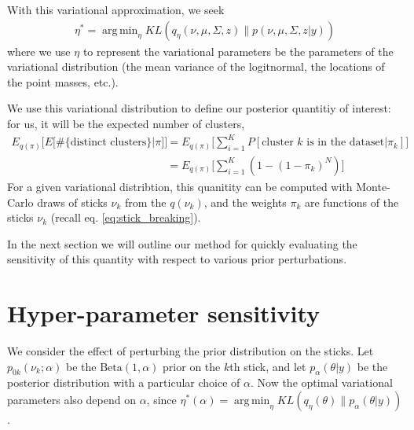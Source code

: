 \documentclass{article}
\DeclareMathOperator*{\argmin}{arg\,min}
\begin{document}
With this variational approximation, we seek
%
\begin{align}
\eta^* = \argmin_{\eta} KL\left(
    q_\eta(\nu, \mu, \Sigma, z) \big\| p(\nu, \mu, \Sigma, z | y)
    \right) \label{eq:kl_objective}
\end{align}
%
where we use $\eta$ to represent the variational parameters be the parameters of
the variational distribution (the mean variance of the logitnormal, the
locations of the point masses, etc.).

We use this variational distribution to define our posterior quantitiy of
interest: for us, it will be the expected number of clusters,
%
\begin{align}
  E_{q(\pi)}\Big[E\Big[\#\{\text{distinct clusters}\}|\pi\Big]\Big] &=
  E_{q(\pi)}\Big[\sum_{i=1}^K P[\text{cluster $k$ is in the dataset}|\pi_k]\Big] \\
    &= E_{q(\pi)} \Big[\sum_{i=1}^K (1 - (1 - \pi_k)^N)\Big]
    \label{eq:expected_num_clusters}
\end{align}
%
For a given variational distribtion, this quanitity can be computed with
Monte-Carlo draws of sticks $\nu_k$ from the $q(\nu_k)$, and the weights $\pi_k$
are functions of the sticks $\nu_k$ (recall eq. \ref{eq:stick_breaking}).

In the next section we will outline our method for quickly evaluating the
sensitivity of this quantity with respect to various prior perturbations.

%

\section{Hyper-parameter sensitivity}

We consider the effect of perturbing the prior distribution on the sticks. Let
$p_{0k}(\nu_k; \alpha)$ be the $\text{Beta}(1, \alpha)$ prior on the $k$th
stick, and let $p_{\alpha}(\theta | y)$ be the posterior distribution with a
particular choice of $\alpha$. Now the optimal variational parameters also
depend on $\alpha$, since $\eta^*(\alpha) = \argmin_\eta
KL(q_\eta\left(\theta\right) \| p_{\alpha}(\theta | y))$.
\end{document}
